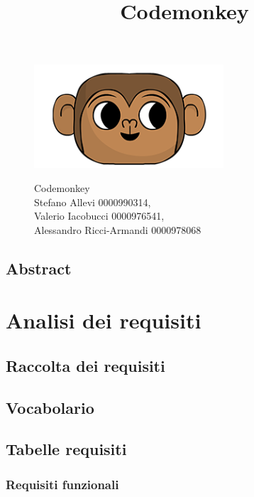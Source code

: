 \documentclass{article}
\title{Codemonkey}
\begin{document}
\begin{figure}[!ht]
   \centering
   \includegraphics[width=0.5\linewidth]{assets/img/icon.png}
   \begin{titlepage}
      \huge {Codemonkey}\\
      \large {Stefano Allevi 0000990314,\\ Valerio Iacobucci 0000976541, \\ Alessandro Ricci-Armandi 0000978068 }
   \end{titlepage}\label{fig:nome-etichetta}
\end{figure}

\renewcommand{\contentsname}{Sommario}
\tableofcontents


\subsection{Abstract}



\section{Analisi dei requisiti}
\subsection{Raccolta dei requisiti}


\subsection{Vocabolario}


\subsection{Tabelle requisiti}
\subsubsection{Requisiti funzionali}

\end{document}
